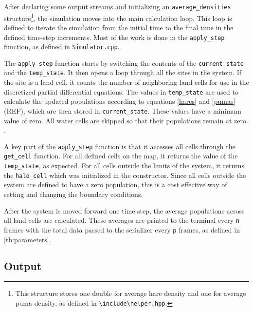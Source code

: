 \documentclass[a4paper,11pt]{article}
\begin{document}
After declaring some output streams and initializing an \texttt{average\_densities} structure\footnote{This structure stores one double for average hare density and one for average puma density, as defined in \texttt{\textbackslash include\textbackslash helper.hpp}.}, the simulation moves into the main calculation loop.  This loop is defined to iterate the simulation from the initial time to the final time in the defined time-step increments.  Most of the work is done in the \texttt{apply\_step} function, as defined in \texttt{Simulator.cpp}.  

The  \texttt{apply\_step} function starts by switching the contents of the  \texttt{current\_state} and the \texttt{temp\_state}.  It then opens a loop through all the sites in the system.  If the site is a land cell, it counts the number of neighboring land cells for use in the discretized partial differential equations.  The values in \texttt{temp\_state} are used to calculate the updated populations according to equations \eqref{hares} and \eqref{pumas} (REF), which are then stored in \texttt{current\_state}.  These values have a minimum value of zero.  All water cells are skipped so that their populations remain at zero.
.  

A key part of the \texttt{apply\_step} function is that it accesses all cells through the \texttt{get\_cell} function.  For all defined cells on the map, it returns the value of the \texttt{temp\_state}, as expected.  For all cells outside the limits of the system, it returns the \texttt{halo\_cell} which was initialized in the constructor.  Since all cells outside the system are defined to have a zero population, this is a cost effective way of setting and changing the boundary conditions.


After the system is moved forward one time step, the average populations across all land cells are calculated.  These averages are printed to the terminal every \texttt{n} frames with the total data passed to the serializer every \texttt{p} frames, as defined in \ref{tb:parameters}.

\subsection{Output}\label{output}
\end{document}
